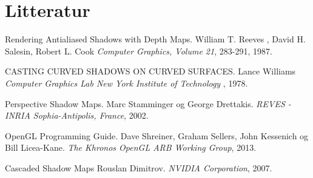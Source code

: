\documentclass[11pt,a4paper]{article}
\begin{document}
\newpage 

\section{Litteratur}

\begin{thebibliography}{100} %
 
\addtolength{\leftmargin}{0.2in} %
\setlength{\itemindent}{-0.2in} 

 Rendering Antialiased Shadows with Depth Maps.
  William T. Reeves , David H. Salesin, Robert L. Cook 
  \emph{Computer Graphics, Volume 21}, 283-291, 1987.
  
 CASTING CURVED SHADOWS ON CURVED SURFACES.
   Lance Williams
  \emph{Computer Graphics Lab New York Institute of Technology }, 1978.

 Perspective Shadow Maps. 
  Marc Stamminger og George Drettakis.
  \emph{REVES - INRIA Sophia-Antipolis, France}, 2002.

 OpenGL Programming Guide.
  Dave Shreiner, Graham Sellers, John Kessenich og Bill Licea-Kane.
  \emph{The Khronos OpenGL ARB Working Group}, 2013.
        
   Cascaded Shadow Maps
  Rouslan Dimitrov.
  \emph{NVIDIA Corporation}, 2007.
        
  
\end{thebibliography} 
\end{document}
